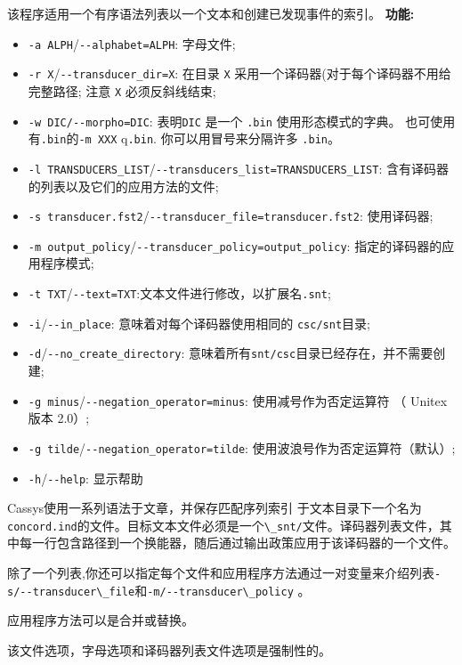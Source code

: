 \bigskip
\noindent 该程序适用一个有序语法列表以一个文本和创建已发现事件的索引。
\bigskip
\noindent \textbf{功能:}
\begin{itemize}
\item \verb+-a ALPH+/\verb+--alphabet=ALPH+: 字母文件;
\item \verb+-r X+/\verb+--transducer_dir=X+: 在目录 \verb+X+ 采用一个译码器(对于每个译码器不用给完整路径; 注意 \verb+X+ 必须反斜线结束;
	\item \verb+-w DIC/--morpho=DIC+: 表明\verb+DIC+ 是一个 \verb+.bin+ 使用形态模式的字典。 
		也可使用有\verb+.bin+的\verb+-m XXX+ q\verb+.bin+. 你可以用冒号来分隔许多 \verb+.bin+。

\item \verb+-l TRANSDUCERS_LIST+/\verb+--transducers_list=TRANSDUCERS_LIST+: 含有译码器的列表以及它们的应用方法的文件;
\item \verb+-s transducer.fst2+/\verb+--transducer_file=transducer.fst2+: 使用译码器;
\item \verb+-m output_policy+/\verb+--transducer_policy=output_policy+: 指定的译码器的应用程序模式;
\item \verb+-t TXT+/\verb+--text=TXT+:文本文件进行修改，以扩展名\verb+.snt+; 
\item \verb+-i+/\verb+--in_place+: 意味着对每个译码器使用相同的 \verb+csc/snt+目录;
\item \verb+-d+/\verb+--no_create_directory+: 意味着所有\verb+snt/csc+目录已经存在，并不需要创建;
\item \verb+-g minus+/\verb+--negation_operator=minus+: 使用减号作为否定运算符 （ Unitex版本 2.0）;
\item \verb+-g tilde+/\verb+--negation_operator=tilde+:   使用波浪号作为否定运算符（默认）;
\item \verb+-h+/\verb+--help+: 显示帮助
\end{itemize} 	


\bigskip
\noindent Cassys使用一系列语法于文章，并保存匹配序列索引
于文本目录下一个名为\verb+concord.ind+的文件。目标文本文件必须是一个\verb+\_snt/+文件。译码器列表文件，其中每一行包含路径到一个换能器，随后通过输出政策应用于该译码器的一个文件。

\bigskip
\noindent 除了一个列表,你还可以指定每个文件和应用程序方法通过一对变量来介绍列表\verb+-s/--transducer\_file+和\verb+-m/--transducer\_policy+ 。
      
\bigskip
\noindent 应用程序方法可以是合并或替换。
      
\bigskip
\noindent 该文件选项，字母选项和译码器列表文件选项是强制性的。
     
